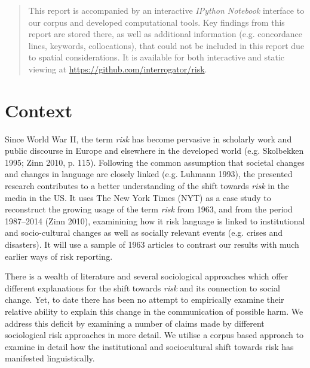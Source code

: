 \documentclass{report}
\begin{document}
\begin{abstract}
    This report is accompanied by an interactive \emph{IPython Notebook} interface to our corpus and developed computational tools. Key findings from this report are stored there, as well as additional information (e.g. concordance lines, keywords, collocations), that could not be included in this report due to spatial considerations. It is available for both interactive and static viewing at \url{https://github.com/interrogator/risk}.

    \end{abstract}
    \cleardoublepage
    \singlespacing
    \tableofcontents
    \onehalfspacing
    \cleardoublepage

\chapter{Context}

Since World War II, the term \emph{risk} has become pervasive in scholarly work and public discourse in Europe and elsewhere in the developed world (e.g. Skolbekken 1995; Zinn 2010, p. 115). Following the common assumption that societal changes and changes in language are closely linked (e.g. Luhmann 1993), the presented research contributes to a better understanding of the shift towards \emph{risk} in the media in the US. It uses The New York Times (NYT) as a case study to reconstruct the growing usage of the term \emph{risk} from 1963, and from the period 1987--2014 (Zinn 2010), examinining how it risk language is linked to institutional and socio-cultural changes as well as socially relevant events (e.g. crises and disasters). It will use a sample of 1963 articles to contrast our results with much earlier ways of risk reporting. 

There is a wealth of literature and several sociological approaches which offer different explanations for the shift towards \emph{risk} and its connection to social change. Yet, to date there has been no attempt to empirically examine their relative ability to explain this change in the communication of possible harm. We address this deficit by examining a number of claims made by different sociological risk approaches in more detail. We utilise a corpus based approach to examine in detail how the institutional and sociocultural shift towards risk has manifested linguistically.
\end{document}
